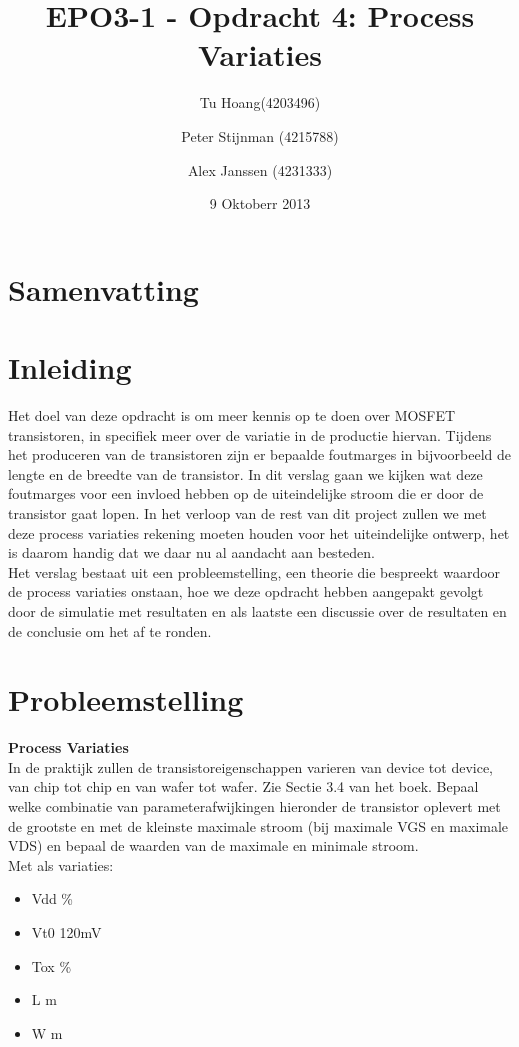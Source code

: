 \documentclass{article}
\author{
Tu Hoang(4203496) \and Peter Stijnman (4215788) \and Alex Janssen (4231333) \\
}
\title{EPO3-1 - Opdracht 4: Process Variaties}
\date{9 Oktoberr 2013}
\begin{document}
\maketitle

\section{Samenvatting}

\tableofcontents
\clearpage

\section{Inleiding}
Het doel van deze opdracht is om meer kennis op te doen over MOSFET transistoren, in specifiek meer over de variatie in de productie hiervan. Tijdens het produceren van de transistoren zijn er bepaalde foutmarges in bijvoorbeeld de lengte en de breedte van de transistor. In dit verslag gaan we kijken wat deze foutmarges voor een invloed hebben op de uiteindelijke stroom die er door de transistor gaat lopen. In het verloop van de rest van dit project zullen we met deze process variaties rekening moeten houden voor het uiteindelijke ontwerp, het is daarom handig dat we daar nu al aandacht aan besteden.\\
Het verslag bestaat uit een probleemstelling, een theorie die bespreekt waardoor de process variaties onstaan, hoe we deze opdracht hebben aangepakt gevolgt door de simulatie met resultaten en als laatste een discussie over de resultaten en de conclusie om het af te ronden.

\section{Probleemstelling}
\textbf{Process Variaties}\\
In de praktijk zullen de transistoreigenschappen varieren van device tot device, van chip tot chip en van 
wafer tot wafer. Zie Sectie 3.4 van het boek. Bepaal welke combinatie van parameterafwijkingen hieronder
de transistor oplevert met de grootste en met de kleinste maximale stroom (bij maximale VGS en maximale
VDS) en bepaal de waarden van de maximale en minimale stroom.\\
Met als variaties:
\newline
\begin {itemize}
	\item Vdd \%
	\item Vt0  \pm 120mV
	\item Tox \%
	\item L \textmu m
	\item W \textmu m
\end {itemize}
\end{document}
